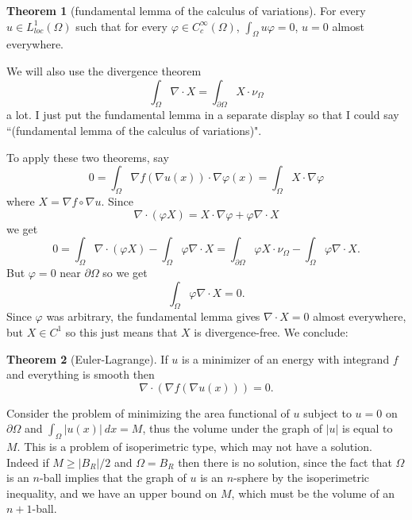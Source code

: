 \documentclass[12pt]{book}
\theoremstyle{definition}
\newtheorem{theorem}{Theorem}[chapter]
\newenvironment{example}
  {\pushQED{\qed}\renewcommand{\qedsymbol}{$\diamondsuit$}\examplex}
  {\popQED\endexamplex}
\begin{document}
\begin{theorem}[fundamental lemma of the calculus of variations]
For every $u \in L^1_{loc}(\Omega)$ such that for every $\varphi \in C^\infty_c(\Omega)$, $\int_\Omega u\varphi = 0$, $u = 0$ almost everywhere.
\end{theorem}

We will also use the divergence theorem
$$\int_\Omega \nabla \cdot X = \int_{\partial \Omega} X \cdot \nu_\Omega$$
a lot. I just put the fundamental lemma in a separate display so that I could say ``(fundamental lemma of the calculus of variations)".

To apply these two theorems, say
$$0 = \int_\Omega \nabla f(\nabla u(x)) \cdot \nabla \varphi(x) = \int_\Omega X \cdot \nabla \varphi$$
where $X = \nabla f \circ \nabla u$.
Since
$$\nabla \cdot (\varphi X) = X \cdot \nabla \varphi + \varphi \nabla \cdot X$$
we get
$$0 = \int_\Omega \nabla \cdot (\varphi X) - \int_\Omega \varphi \nabla \cdot X = \int_{\partial \Omega} \varphi X \cdot \nu_\Omega - \int_\Omega \varphi \nabla \cdot X.$$
But $\varphi = 0$ near $\partial \Omega$ so we get
$$\int_\Omega \varphi \nabla \cdot X = 0.$$
Since $\varphi$ was arbitrary, the fundamental lemma gives $\nabla \cdot X = 0$ almost everywhere, but $X \in C^1$ so this just means that $X$ is divergence-free.
We conclude:

\begin{theorem}[Euler-Lagrange]
If $u$ is a minimizer of an energy with integrand $f$ and everything is smooth then
$$\nabla \cdot (\nabla f(\nabla u(x))) = 0.$$
\end{theorem}

\begin{example}
Consider the problem of minimizing the area functional of $u$ subject to $u = 0$ on $\partial \Omega$ and $\int_\Omega |u(x)| ~dx = M$, thus the volume under the graph of $|u|$ is equal to $M$.
This is a problem of isoperimetric type, which may not have a solution.
Indeed if $M \geq |B_R|/2$ and $\Omega = B_R$ then there is no solution, since the fact that $\Omega$ is an $n$-ball implies that the graph of $u$ is an $n$-sphere by the isoperimetric inequality, and we have an upper bound on $M$, which must be the volume of an $n+1$-ball.
\end{example}
\end{document}
